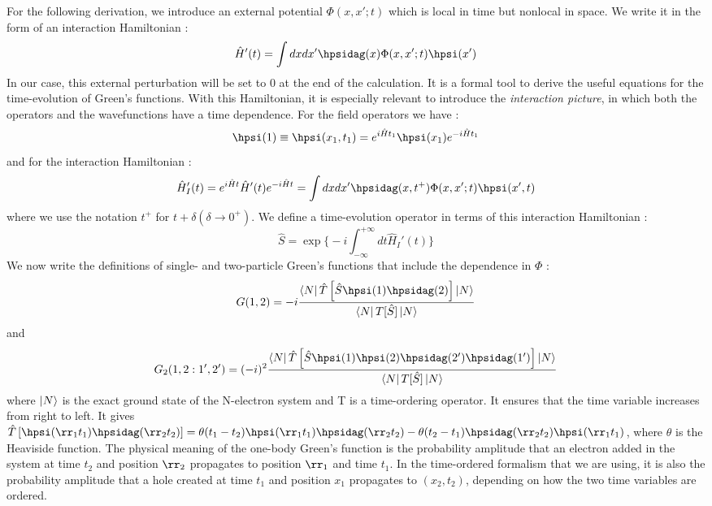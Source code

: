 For the following derivation, we introduce an external potential $\Phi(x,x';t)$ which is local in time but nonlocal in space. We write it in the form of an interaction Hamiltonian :
\begin{equation}
	\hat{H}'(t) = \int dx dx' \hpsidag(x) \Phi(x,x';t) \hpsi(x') 
\end{equation}
In our case, this external perturbation will be set to 0 at the end of the calculation. It is a formal tool to derive the useful equations for the time-evolution of Green's functions. With this Hamiltonian, it is especially relevant to introduce the \textit{interaction picture}, in which both the operators and the wavefunctions have a time dependence.\cite{martin2016interacting} For the field operators we have :
\begin{equation}
	\hpsi(1) \equiv \hpsi(x_1, t_1) = e^{i\hat{H} t_1} \hpsi(x_1) e^{-i\hat{H} t_1}
\end{equation}
and for the interaction Hamiltonian :
\begin{equation}
	\hat{H}_I'(t) = e^{i\hat{H} t} \hat{H}'(t) e^{-i\hat{H} t} = \int dx dx' \hpsidag(x,t^+) \Phi(x,x';t) \hpsi(x',t)
\end{equation}
where we use the notation $t^+$ for $t+\delta (\delta \to 0^+)$. We define a time-evolution operator in terms of this interaction Hamiltonian :
\begin{equation}
	\hat{S} = \exp\biggl\{ -i \int_{-\infty}^{+\infty} dt \hat{H}_I'(t) \biggr\} \label{eq:def_time_ev_op}
\end{equation}
We now write the definitions of single- and two-particle Green's functions that include the dependence in $\Phi$ :
\begin{equation}
	G(1,2) = -i \frac{\bra{N}\hat{T}\left[\hat{S}\hpsi(1)\hpsidag(2)\right]\ket{N}}{\bra{N}T[\hat{S}]\ket{N}} \label{eq:GF}
\end{equation}
and
\begin{equation}
	G_2(1,2:1',2') = (-i)^2  \frac{\bra{N}\hat{T}\left[\hat{S}\hpsi(1)\hpsi(2)\hpsidag(2')\hpsidag(1')\right]\ket{N}}{\bra{N}T[\hat{S}]\ket{N}}\label{eq:2GF}
\end{equation}
where $\ket{N}$ is the exact ground state of the N-electron system and T is a time-ordering operator. It ensures that the time variable increases from right to left. It gives $\hat{T}\left[ \hpsi(\rr_1 t_1) \hpsidag(\rr_2 t_2) \right] = \theta(t_1 - t_2) \hpsi(\rr_1 t_1) \hpsidag(\rr_2 t_2) - \theta(t_2-t_1)\hpsidag(\rr_2 t_2)\hpsi(\rr_1 t_1)$, where $\theta$ is the Heaviside function.\cite{fetter2012quantum} The physical meaning of the one-body Green's function is the probability amplitude that an electron added in the system at time $t_2$ and position $\rr_2$ propagates to position $\rr_1$ and time $t_1$. In the time-ordered formalism that we are using, it is also the probability amplitude that a hole created at time $t_1$ and position $x_1$ propagates to $(x_2,t_2)$, depending on how the two time variables are ordered. 

